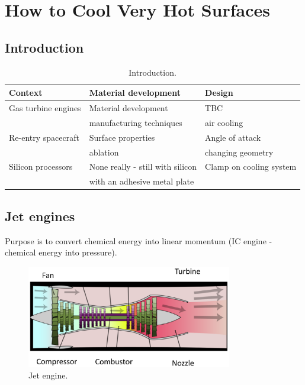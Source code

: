\chapter{How to Cool Very Hot Surfaces}
\section{Introduction}
\begin{table}[H]
    \centering
    \begin{tabular}{@{}lll@{}}
        \toprule
        \textbf{Context}    & \textbf{Material development}    & \textbf{Design}         \\
        \midrule
        Gas turbine engines & Material development             & TBC                     \\
                            & manufacturing techniques         & air cooling             \\
        Re-entry spacecraft & Surface properties               & Angle of attack         \\
                            & ablation                         & changing geometry       \\
        Silicon processors  & None really - still with silicon & Clamp on cooling system \\
                            & with an adhesive metal plate                               \\
        \bottomrule
    \end{tabular}
    \caption{Introduction.}
\end{table}
\section{Jet engines}
Purpose is to convert chemical energy into linear momentum (IC engine - chemical energy into pressure).
\begin{figure}[H]
    \centering
    \includegraphics[width = 0.8\textwidth]{img/figure19.png}
    \caption{Jet engine.}
\end{figure}
